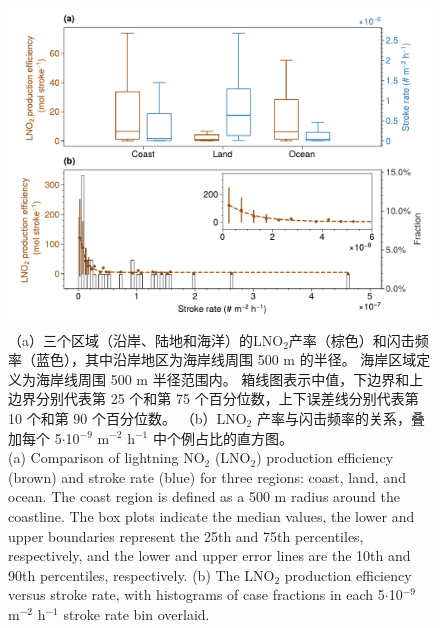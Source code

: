 \begin{figure}[htbp]
\centering
\includegraphics[width=15cm]{./figures/arctic_pe_rate.pdf}
\caption{
（a）三个区域（沿岸、陆地和海洋）的LNO$_2$产率（棕色）和闪击频率（蓝色），其中沿岸地区为海岸线周围 500 m 的半径。
海岸区域定义为海岸线周围 500 m 半径范围内。
箱线图表示中值，下边界和上边界分别代表第 25 个和第 75 个百分位数，上下误差线分别代表第 10 个和第 90 个百分位数。
（b）LNO$_2$ 产率与闪击频率的关系，叠加每个 5$\cdot$10$^{-9}$ m$^{-2}$ h$^{-1}$ 中个例占比的直方图。 \\
(a) Comparison of lightning NO$_2$ (LNO$_2$) production efficiency (brown) and stroke rate (blue) for three regions: coast, land, and ocean.
The coast region is defined as a 500 m radius around the coastline.
The box plots indicate the median values, the lower and upper boundaries represent the 25th and 75th percentiles, respectively, and the lower and upper error lines are the 10th and 90th percentiles, respectively.
(b) The LNO$_2$ production efficiency versus stroke rate, with histograms of case fractions in each 5$\cdot$10$^{-9}$ m$^{-2}$ h$^{-1}$ stroke rate bin overlaid.
}
\label{fig:arctic_pe_rate}
\end{figure}


